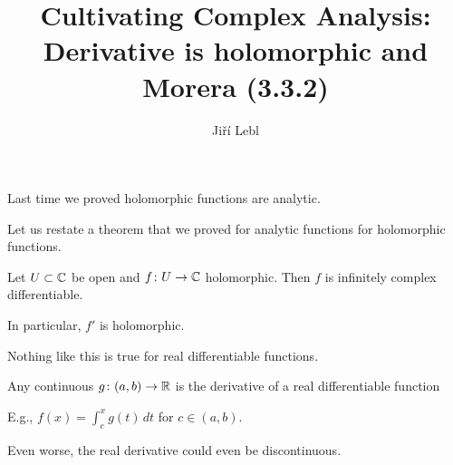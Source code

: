 \documentclass[10pt,aspectratio=169]{beamer}
\author{Ji\v{r}\'i Lebl}
\institute[OSU]{%
Departemento pri Matematiko de Oklahoma {\^S}tata Universitato}
\title{Cultivating Complex Analysis:\\%
Derivative is holomorphic and Morera (3.3.2)}
\date{}
\begin{document}
\begin{frame}
\titlepage
\end{frame}

\begin{frame}
Last time we proved holomorphic functions are analytic.

\medskip
\pause

Let us restate a theorem that we proved
for analytic functions for holomorphic functions.

\pause

\begin{theorem}
Let $U \subset {\mathbb{C}}$ be open and $f \colon U \to {\mathbb{C}}$ holomorphic.  Then
$f$ is infinitely complex differentiable.

\pause
In particular, $f'$ is holomorphic.
\end{theorem}

\pause

Nothing like this is true for real differentiable functions.

\medskip
\pause

Any continuous $g \colon (a,b) \to {\mathbb{R}}$ is the derivative of a real differentiable function

E.g., $f(x) = \int_c^x g(t)\,dt$ for $c \in (a,b)$.

\medskip
\pause

Even worse, the real derivative could even be discontinuous.

\end{frame}
\end{document}

